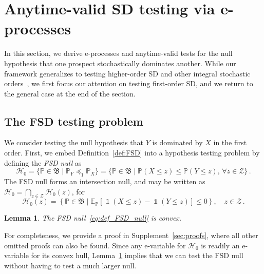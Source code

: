 \documentclass[12pt,twoside]{article}
\theoremstyle{plain}
\newtheorem{lemma}{Lemma}
\theoremstyle{definition}
\theoremstyle{remark}
\newcommand{\inparen}[1]{\left(#1\right)}
\DeclareMathOperator*{\indsymb}{\mathds{1}}
\newcommand{\indicator}[1]{\indsymb\inparen{#1}}
\newcommand{\calH}{\mathcal{H}}
\newcommand{\calZ}{\mathcal{Z}}
\newcommand{\Esymb}{\mathbb{E}}
\newcommand{\Psymb}{\mathbb{P}}
\newcommand{\Ex}[2]{\Esymb_{{#1}}\left[{#2}\right]}
\newcommand{\frakB}{\mathfrak{B}}
\newcommand{\sd}{\preceq}
\begin{document}
\section{Anytime-valid SD testing via e-processes}\label{sec:FSD}

In this section, we derive e-processes and anytime-valid tests for the null hypothesis that one prospect stochastically dominates another.
While our framework generalizes to testing higher-order SD and other integral stochastic orders~\citep{feng2025integral}, we first focus our attention on testing first-order SD, and we return to the general case at the end of the section. 

\subsection{The FSD testing problem}\label{subsec:formulation_of_FSD_null}

We consider testing the null hypothesis that $Y$ is dominated by $X$ in the first order.  
First, we embed Definition~\ref{def:FSD} into a hypothesis testing problem by defining the \emph{FSD null} as
\begin{equation}\label{eq:def_FSD_null}
    \calH_0 = \{\Psymb \in \frakB \mid \Psymb_Y \sd_1 \Psymb_X \} =\{\Psymb \in \frakB \mid \Psymb(X\leq z) \leq \Psymb(Y\leq z),\, \forall z\in \calZ\}\,.
\end{equation}
The FSD null forms an intersection null, and may be written as $\calH_0 =\bigcap_{z \in \calZ}\calH_0 (z)$,
for 
\begin{equation}\label{eq:FSD_null_at_thresholds}
 \calH_0 (z)
 =\left\{\Psymb \in \frakB \mid \Ex{\Psymb}{\indicator{X \leq z} - \indicator{Y \leq z}}\leq 0\right\}, \quad z\in \calZ\,.
\end{equation}

\begin{lemma}\label{lem:FSD-null-is-convex}
    The FSD null~\eqref{eq:def_FSD_null} is convex.
\end{lemma}


For completeness, we provide a proof in Supplement~\ref{sec:proofs}, where all other omitted proofs can also be found. 
Since any e-variable for $\calH_0$ is readily an e-variable for its convex hull, Lemma~\ref{lem:FSD-null-is-convex} implies that we can test the FSD null without having to test a much larger null. 
\end{document}
